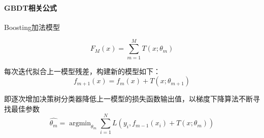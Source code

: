 \paragraph{GBDT相关公式}

Boosting加法模型

\begin{equation}
    F_M(x)=\sum_{m=1}^{M} T(x; \theta_m)
\end{equation}

每次迭代拟合上一模型残差，构建新的模型如下：
\[f_{m+1}(x)=f_{m}(x)+T(x; \theta_{m+1})\]

即逐次增加决策树分类器降低上一模型的损失函数输出值，以梯度下降算法不断寻找最佳参数
\begin{equation}
    \hat{\theta_m}=\mathop{\arg\min}_{\theta_m}\sum_{i=1}^{N}L(y_i, f_{m-1}(x_i)+T(x; \theta_m))
\end{equation}